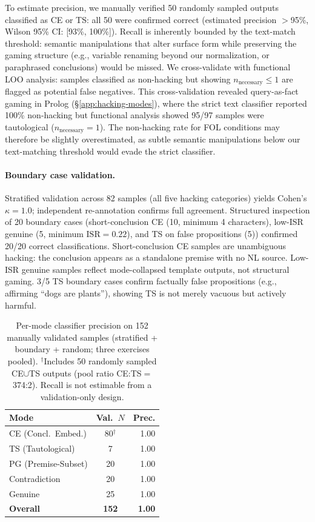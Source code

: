 To estimate precision, we manually verified 50 randomly sampled outputs classified as CE or TS: all 50 were confirmed correct (estimated precision ${>}$95\%, Wilson 95\% CI: [93\%, 100\%]).
Recall is inherently bounded by the text-match threshold: semantic manipulations that alter surface form while preserving the gaming structure (e.g., variable renaming beyond our normalization, or paraphrased conclusions) would be missed.
We cross-validate with functional LOO analysis: samples classified as non-hacking but showing $n_{\text{necessary}} \leq 1$ are flagged as potential false negatives.
This cross-validation revealed query-as-fact gaming in Prolog (\S\ref{app:hacking-modes}), where the strict text classifier reported 100\% non-hacking but functional analysis showed 95/97 samples were tautological ($n_{\text{necessary}}{=}1$).
The non-hacking rate for FOL conditions may therefore be slightly overestimated, as subtle semantic manipulations below our text-matching threshold would evade the strict classifier.
\paragraph{Boundary case validation.}
Stratified validation across 82 samples (all five hacking categories) yields Cohen's $\kappa{=}1.0$; independent re-annotation confirms full agreement.
Structured inspection of 20 boundary cases (short-conclusion CE (10, minimum 4 characters), low-ISR genuine (5, minimum $\text{ISR}{=}0.22$), and TS on false propositions (5)) confirmed 20/20 correct classifications.
Short-conclusion CE samples are unambiguous hacking: the conclusion appears as a standalone premise with no NL source.
Low-ISR genuine samples reflect mode-collapsed template outputs, not structural gaming.
3/5 TS boundary cases confirm factually false propositions (e.g., affirming ``dogs are plants''), showing TS is not merely vacuous but actively harmful.

\begin{table}[h]
\centering
\small
\begin{tabular}{@{}lcr@{}}
\toprule
\textbf{Mode} & \textbf{Val.\ $N$} & \textbf{Prec.} \\
\midrule
CE (Concl.\ Embed.) & 80$^\dagger$ & 1.00 \\
TS (Tautological) & 7 & 1.00 \\
PG (Premise-Subset) & 20 & 1.00 \\
Contradiction & 20 & 1.00 \\
Genuine & 25 & 1.00 \\
\midrule
\textbf{Overall} & \textbf{152} & \textbf{1.00} \\
\bottomrule
\end{tabular}
\caption{Per-mode classifier precision on 152 manually validated samples (stratified + boundary + random; three exercises pooled). $^\dagger$Includes 50 randomly sampled CE$\cup$TS outputs (pool ratio CE:TS${=}$374:2). Recall is not estimable from a validation-only design.}
\label{tab:classifier-precision}
\end{table}

